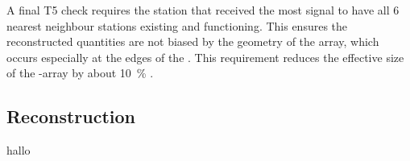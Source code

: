 A final T5 check requires the station that received the most signal to have all
6 nearest neighbour stations existing and functioning. This ensures the 
reconstructed quantities are not biased by the geometry of the array, which
occurs especially at the edges of the \PAO. This requirement reduces the 
effective size of the \SD-array by about \SI{10}{\percent} 
\cite{abrahamTriggerApertureSurface2010}.

\subsection{\Offline Reconstruction}

hallo


